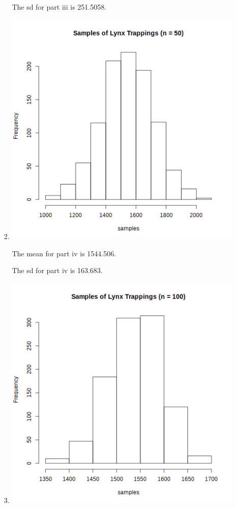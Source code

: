 \documentclass[12pt,letterpaper]{article}
\begin{document}
\begin{enumerate}
\begin{enumerate}
\begin{enumerate}
              The sd for part iii is \num{251.5058}.
            \item
              \includegraphics[width=\linewidth]{prob3b_iv.png}

              The mean for part iv is \num{1544.506}.

              The sd for part iv is \num{163.683}.
            \item
              \includegraphics[width=\linewidth]{prob3b_v.png}


\end{enumerate}
\end{enumerate}
\end{enumerate}
\end{document}
